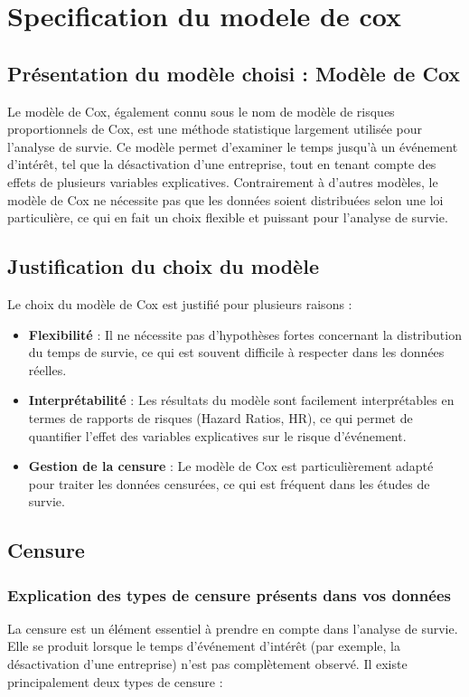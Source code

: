 \documentclass[a4paper,12pt]{report}
\begin{document}
\section{Specification du modele de cox}
\subsection{Présentation du modèle choisi : Modèle de Cox}
Le modèle de Cox, également connu sous le nom de modèle de risques proportionnels de Cox, est une méthode statistique largement utilisée pour l'analyse de survie. Ce modèle permet d'examiner le temps jusqu'à un événement d'intérêt, tel que la désactivation d'une entreprise, tout en tenant compte des effets de plusieurs variables explicatives. Contrairement à d'autres modèles, le modèle de Cox ne nécessite pas que les données soient distribuées selon une loi particulière, ce qui en fait un choix flexible et puissant pour l'analyse de survie.

\subsection{Justification du choix du modèle}
Le choix du modèle de Cox est justifié pour plusieurs raisons :

\begin{itemize}
    \item \textbf{Flexibilité} : Il ne nécessite pas d'hypothèses fortes concernant la distribution du temps de survie, ce qui est souvent difficile à respecter dans les données réelles.
    \item \textbf{Interprétabilité} : Les résultats du modèle sont facilement interprétables en termes de rapports de risques (Hazard Ratios, HR), ce qui permet de quantifier l'effet des variables explicatives sur le risque d'événement.
    \item \textbf{Gestion de la censure} : Le modèle de Cox est particulièrement adapté pour traiter les données censurées, ce qui est fréquent dans les études de survie.
\end{itemize}

\subsection{Censure}
\subsubsection{Explication des types de censure présents dans vos données}
La censure est un élément essentiel à prendre en compte dans l'analyse de survie. Elle se produit lorsque le temps d'événement d'intérêt (par exemple, la désactivation d'une entreprise) n'est pas complètement observé. Il existe principalement deux types de censure :
\end{document}
